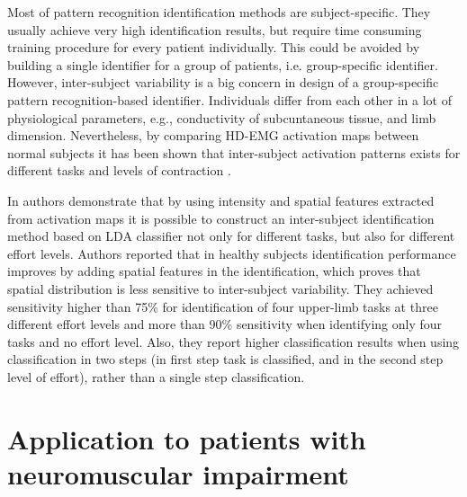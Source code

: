 Most of pattern recognition identification methods are subject-specific. They usually achieve very high identification results, but require time consuming training procedure for every patient individually. This could be avoided by building a single identifier for a group of patients, i.e. group-specific identifier. However, inter-subject variability is a big concern in design of a group-specific pattern recognition-based identifier. Individuals differ from each other in a lot of physiological parameters, e.g., conductivity of subcuntaneous tissue, and limb dimension. Nevertheless, by comparing HD-EMG activation maps between normal subjects it has been shown that inter-subject activation patterns exists for different tasks and levels of contraction \citep{Rojas-Martinez2012}.

In \citep{Rojas-Martinez2013} authors demonstrate that by using intensity and spatial features extracted from activation maps it is possible to construct an inter-subject identification method based on LDA classifier not only for different tasks, but also for different effort levels. Authors reported that in healthy subjects identification performance improves by adding spatial features in the identification, which proves that spatial distribution is less sensitive to inter-subject variability. They achieved sensitivity higher than 75\% for identification of four upper-limb tasks at three different effort levels and more than 90\% sensitivity when identifying only four tasks and no effort level. Also, they report higher classification results when using classification in two steps (in first step task is classified, and in the second step level of effort), rather than a single step classification.


\section{Application to patients with neuromuscular impairment}

